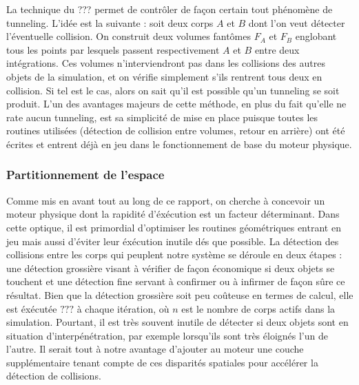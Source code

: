 \begin{figure}
  \centering
  
  \caption{}
  \label{tunneling2}
\end{figure}

La technique du ??? permet de contrôler de façon certain tout
phénomène de tunneling. L'idée est la suivante : soit deux corps $A$
et $B$ dont l'on veut détecter l'éventuelle collision. On construit
deux volumes fantômes $F_A$ et $F_B$ englobant tous les points par
lesquels passent respectivement $A$ et $B$ entre deux
intégrations. Ces volumes n'interviendront pas dans les collisions des
autres objets de la simulation, et on vérifie simplement s'ils
rentrent tous deux en collision. Si tel est le cas, alors on sait
qu'il est possible qu'un tunneling se soit produit. L'un des avantages
majeurs de cette méthode, en plus du fait qu'elle ne rate aucun
tunneling, est sa simplicité de mise en place puisque toutes les
routines utilisées (détection de collision entre volumes, retour en
arrière) ont été écrites et entrent déjà en jeu dans le fonctionnement
de base du moteur physique.

\begin{figure}
  \centering
  
  \caption{}
  \label{tunneling3}
\end{figure}

\subsubsection{Partitionnement de l'espace}

Comme mis en avant tout au long de ce rapport, on cherche à concevoir
un moteur physique dont la rapidité d'éxécution est un facteur
déterminant. Dans cette optique, il est primordial d'optimiser les
routines géométriques entrant en jeu mais aussi d'éviter leur
éxécution inutile dés que possible. La détection des collisions entre
les corps qui peuplent notre système se déroule en deux étapes : une
détection grossière visant à vérifier de façon économique si deux
objets se touchent et une détection fine servant à confirmer ou à
infirmer de façon sûre ce résultat. Bien que la détection grossière
soit peu coûteuse en termes de calcul, elle est éxécutée $???$ à
chaque itération, o\`u $n$ est le nombre de corps actifs dans la
simulation. Pourtant, il est très souvent inutile de détecter si deux
objets sont en situation d'interpénétration, par exemple lorsqu'ils
sont très éloignés l'un de l'autre. Il serait tout à notre avantage
d'ajouter au moteur une couche supplémentaire tenant compte de ces
disparités spatiales pour accélérer la détection de collisions.

